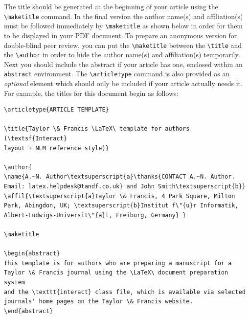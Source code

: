 \documentclass[]{interact}
\theoremstyle{plain}%
\theoremstyle{definition}
\theoremstyle{remark}
\begin{document}
The title should be generated at the beginning of your article using the \verb"\maketitle" command.
In the final version the author name(s) and affiliation(s) must be followed immediately by \verb"\maketitle" as shown below in order for them to be displayed in your PDF document.
To prepare an anonymous version for double-blind peer review, you can put the \verb"\maketitle" between the \verb"\title" and the \verb"\author" in order to hide the author name(s) and affiliation(s) temporarily.
Next you should include the abstract if your article has one, enclosed within an \texttt{abstract} environment.
The \verb"\articletype" command is also provided as an \emph{optional} element which should only be included if your article actually needs it.
For example, the titles for this document begin as follows:
\begin{verbatim}
\articletype{ARTICLE TEMPLATE}

\title{Taylor \& Francis \LaTeX\ template for authors (\textsf{Interact}
layout + NLM reference style)}

\author{
\name{A.~N. Author\textsuperscript{a}\thanks{CONTACT A.~N. Author.
Email: latex.helpdesk@tandf.co.uk} and John Smith\textsuperscript{b}}
\affil{\textsuperscript{a}Taylor \& Francis, 4 Park Square, Milton
Park, Abingdon, UK; \textsuperscript{b}Institut f\"{u}r Informatik,
Albert-Ludwigs-Universit\"{a}t, Freiburg, Germany} }

\maketitle

\begin{abstract}
This template is for authors who are preparing a manuscript for a
Taylor \& Francis journal using the \LaTeX\ document preparation system
and the \texttt{interact} class file, which is available via selected
journals' home pages on the Taylor \& Francis website.
\end{abstract}
\end{verbatim}
\end{document}
